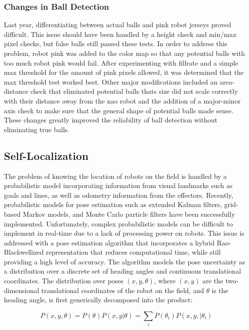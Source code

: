 \documentclass{article}
\begin{document}
\subsubsection{Changes in Ball Detection}
	Last year, differentiating between actual balls and pink robot jerseys proved difficult. This issue should have been handled by a height check and min/max pixel checks, but false balls still passed these tests. In order to address this problem, robot pink was added to the color map so that any potential balls with too much robot pink would fail. After experimenting with fillrate and a simple max threshold for the amount of pink pixels allowed, it was determined that the max threshold test worked best.  		
	Other major modifications included an area-distance check that eliminated potential balls thats size did not scale correctly with their distance away from the nao robot and the addition of a major-minor axis check to make sure that the general shape of potential balls made sense.  These changes greatly improved the reliability of ball detection without eliminating true balls.

\subsection{Self-Localization}
	The problem of knowing the location of robots on the field is handled by a probabilistic model incorporating information from visual landmarks such as goals and lines, as well as odometry information from the effectors. Recently, probabilistic models for pose estimation such as extended Kalman filters, grid-based Markov models, and Monte Carlo particle filters have been successfully implemented. Unfortunately, complex probabilistic models can be difficult to implement in real-time due to a lack of processing power on robots. This issue is addressed with a pose estimation algorithm that incorporates a hybrid Rao-Blackwellized representation that reduces computational time, while still providing a high level of accuracy. The algorithm models the pose uncertainty as a distribution over a discrete set of heading angles and continuous translational coordinates. The distribution over poses \((x,y,\theta)\), where \((x,y)\) are the two-dimensional translational coordinates of the robot on the field, and $\theta$ is the heading angle, is first generically decomposed into the product:

	\begin{equation}
		P(x,y,\theta) = P(\theta)P(x,y|\theta) = \sum\limits_{i} P(\theta_{i})P(x,y,|\theta_{i})
	\end{equation}
\end{document}
